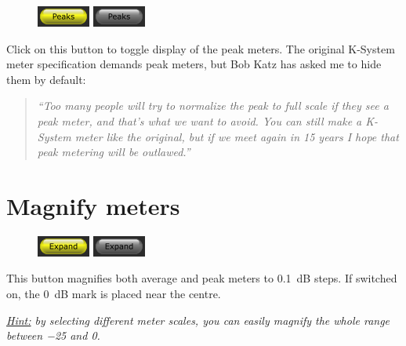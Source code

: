 \begin{figure}
  \includegraphics[scale=\screenshotscale,clip]{include/images/button_peak_meter_on.png}
  \newline \vspace{-0.9\baselineskip}
  \includegraphics[scale=\screenshotscale,clip]{include/images/button_peak_meter_off.png}
\end{figure}

Click on this button to toggle display of the peak meters.  The
original K-System meter specification demands peak meters, but Bob
Katz has asked me to hide them by default:

\begin{quotation}
  \emph{``Too many people will try to normalize the peak to full scale
    if they see a peak meter, and that's what we want to avoid.  You
    can still make a K-System meter like the original, but if we meet
    again in \num{15} years I hope that peak metering will be
    outlawed.''}
\end{quotation}

\section{Magnify meters}

\begin{figure}
  \includegraphics[scale=\screenshotscale,clip]{include/images/button_expand_meter_on.png}
  \newline \vspace{-0.9\baselineskip}
  \includegraphics[scale=\screenshotscale,clip]{include/images/button_expand_meter_off.png}
\end{figure}

This button magnifies both average and peak meters to \SI{0.1}{\dB}
steps.  If switched on, the \SI{0}{\dB} mark is placed near the
centre.

\emph{\underline{Hint:} by selecting different meter scales, you can
  easily magnify the whole range between \SI{-25}{\dBFS} and
  \SI{0}{\dBFS}.}

